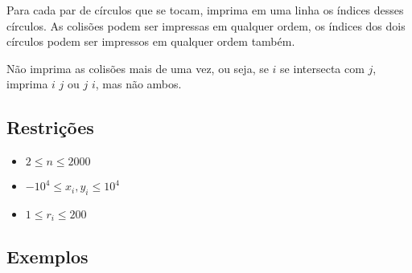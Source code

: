 Para cada par de círculos que se tocam, imprima em uma linha os índices desses círculos. As colisões podem ser impressas em qualquer ordem, os índices dos dois círculos podem ser impressos em qualquer ordem também.

Não imprima as colisões mais de uma vez, ou seja, se $i$ se intersecta com $j$, imprima $i$  $j$ ou $j$ $i$, mas não ambos.


\subsection*{Restrições}
\begin{itemize}
  \item $2 \leq n \leq 2000$
  \item $-10^4 \leq x_i, y_i \leq 10^4$
  \item $1 \leq r_i \leq 200$
\end{itemize}

\subsection*{Exemplos}

